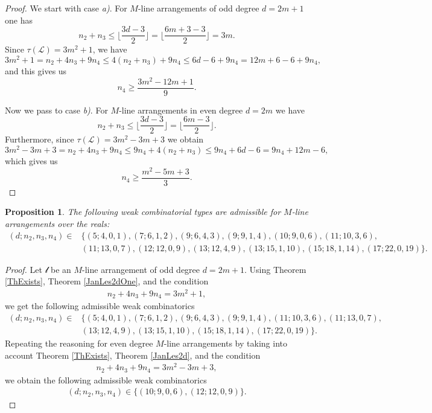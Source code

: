 \documentclass[12pt]{article}
\theoremstyle{plain}
\newtheorem{proposition}[thm]{Proposition}
\theoremstyle{definition}
\begin{document}
\begin{proof} 
We start with case {\it a)}. For $M$-line arrangements of odd degree $d=2m+1$ one has
\[n_2+n_3\leq \bigg\lfloor\frac{3d-3}{2}\bigg\rfloor=\bigg\lfloor\frac{6m+3-3}{2}\bigg\rfloor=3m.\]
Since $\tau(\mathcal{L}) = 3m^{2}+1$, we have
$$3m^2+1=n_2+4n_3+9n_4 \leq 4(n_2+n_3)+9n_4 \leq 6d-6+9n_4=12m+6-6+9n_4,$$
and this gives us
$$n_4 \geq \frac{3m^2-12m+1}{9}.$$

Now we pass to case {\it b)}. For $M$-line arrangements in even degree $d=2m$ we have
\[n_2+n_3\leq \bigg\lfloor\frac{3d-3}{2}\bigg\rfloor=\bigg\lfloor\frac{6m-3}{2}\bigg\rfloor .\]
Furthermore, since $\tau(\mathcal{L}) = 3m^{2}-3m+3$ we obtain
$$3m^2-3m+3=n_2+4n_3+9n_4 \leq 9n_4+4(n_2+n_3) \leq 9n_4 + 6d-6=9n_4+12m-6,$$
which gives us
$$n_4 \geq \frac{m^2-5m+3}{3}.$$
\end{proof}
\begin{proposition}
The following weak combinatorial types are admissible for $M$-line arrangements over the reals:
\begin{align*}
(d;n_{2},n_{3},n_{4}) \in & \{(5;4,0,1), (7;6,1,2), (9;6,4,3), (9;9,1,4), (10;9,0,6), (11;10,3,6), \\ & (11;13,0,7), (12;12,0,9), (13;12,4,9), (13;15,1,10), (15;18,1,14), (17;22,0,19)\}.    
\end{align*}
\end{proposition}
\begin{proof}
Let $\mathcal{l}$ be an $M$-line arrangement of odd degree 
$d = 2m+1$. Using Theorem \ref{ThExists}, Theorem \ref{JanLes2dOne}, and the condition
\begin{align*} 
n_{2} + 4n_{3} + 9n_{4} = 3m^2+1,
\end{align*}
we get the following admissible weak combinatorics
\begin{align*}
(d; n_2, n_3, n_4) \in & \{(5; 4, 0, 1),
 (7; 6, 1, 2), (9; 6, 4, 3),
 (9; 9, 1, 4), (11; 10, 3, 6), 
 (11; 13, 0, 7),\\ & (13; 12, 4, 9),
 (13; 15, 1, 10), (15; 18, 1, 14),
 (17; 22, 0, 19)\}.
\end{align*}
Repeating the reasoning for even degree $M$-line arrangements by taking into account Theorem \ref{ThExists}, Theorem \ref{JanLes2d}, and the condition
\begin{align*}
n_{2} + 4n_{3} + 9n_{4} = 3m^2-3m+3,
\end{align*}
we obtain the following admissible weak combinatorics
\begin{align*}(d; n_2, n_3, n_4) \in \{(10; 9, 0, 6),(12; 12, 0, 9)\}.
\end{align*}

\end{proof}
\end{document}
